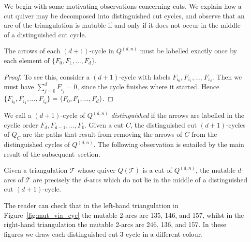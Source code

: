 \documentclass[ALCO,Unicode,published]{cedram}
\newcommand{\qdn}{Q^{(d, n)}}
\begin{document}
We begin with some motivating observations concerning cuts. We explain how a cut quiver may be decomposed into distinguished cut cycles, and observe that an arc of the triangulation is mutable if and only if it does not occur in the middle of a distinguished cut cycle.

\begin{lemm}\label{lem:cycles}
The arrows of each $(d + 1)$-cycle in $Q^{(d, n)}$ must be labelled exactly once by each element of $\{F_{0}, F_{1}, \dots, F_{d}\}$.
\end{lemm}
\begin{proof}
To see this, consider a $(d + 1)$-cycle with labels $F_{i_{0}}, F_{i_{1}}, \dots, F_{i_{d}}$. Then we must have $\sum_{j = 0}^{d} F_{i_{j}} = 0$, since the cycle finishes where it started. Hence $\{F_{i_{0}}, F_{i_{1}}, \dots, F_{i_{d}}\} = \{F_{0}, F_{1}, \dots, F_{d}\}$.
\end{proof}

We call a $(d + 1)$-cycle of $Q^{(d, n)}$ \emph{distinguished} if the arrows are labelled in the cyclic order $F_{d}, F_{d - 1}, \dots, F_{0}$. Given a cut $C$, the distinguished cut $(d + 1)$-cycles of $Q_{C}$ are the paths that result from removing the arrows of $C$ from the distinguished cycles of $\qdn$. The following observation is entailed by the main result of the subsequent~section.

\begin{obs}\label{obs:cut_mut}
Given a triangulation $\mathcal{T}$ whose quiver $Q(\mathcal{T})$ is a cut of $Q^{(d, n)}$, the mutable $d$-arcs of $\mathcal{T}$ are precisely the $d$-arcs which do not lie in the middle of a distinguished cut $(d + 1)$-cycle.
\end{obs}

\begin{exam}
The reader can check that in the left-hand triangulation in Figure~\ref{fig:mut_via_cyc} the mutable 2-arcs are 135, 146, and 157, whilst in the right-hand triangulation the mutable 2-arcs are 246, 136, and 157. In these figures we draw each distinguished cut $3$-cycle in a different colour.
\end{exam}
\end{document}
